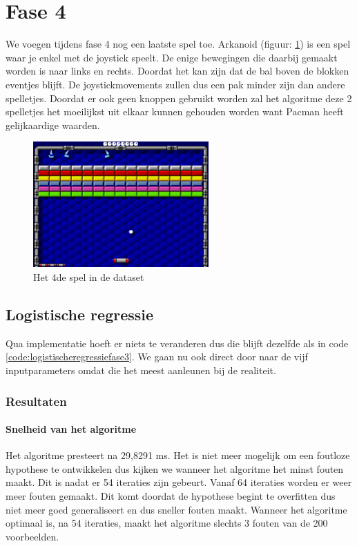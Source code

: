 
\newpage
\section{Fase 4}
\label{sec:Fase4}

We voegen tijdens fase 4 nog een laatste spel toe. Arkanoid (figuur: \ref{fig:akranoid}) is een spel waar je enkel met de joystick speelt. De enige bewegingen die daarbij gemaakt worden is naar links en rechts. Doordat het kan zijn dat de bal boven de blokken eventjes blijft. De joystickmovements zullen dus een pak minder zijn dan andere spelletjes. Doordat er ook geen knoppen gebruikt worden zal het algoritme deze 2 spelletjes het moeilijkst uit elkaar kunnen gehouden worden want Pacman heeft gelijkaardige waarden. 

\begin{figure}[]
	\centering
	\includegraphics[width=0.6\textwidth]{img/arkanoid.png}
	\caption{Het 4de spel in de dataset}
	\label{fig:akranoid}
\end{figure}

\subsection{Logistische regressie}
\label{sec:Logistischeregressie-fase4}

Qua implementatie hoeft er niets te veranderen dus die blijft dezelfde als in code \ref{code:logistischeregressiefase3}. We gaan nu ook direct door naar de vijf inputparameters omdat die het meest aanleunen bij de realiteit. 

\subsubsection{Resultaten}
\paragraph{Snelheid van het algoritme} 
Het algoritme presteert na 29,8291 ms. Het is niet meer mogelijk om een foutloze hypothese te ontwikkelen dus kijken we wanneer het algoritme het minst fouten maakt. Dit is nadat er 54 iteraties zijn gebeurt. Vanaf 64 iteraties worden er weer meer fouten gemaakt. Dit komt doordat de hypothese begint te overfitten dus niet meer goed generaliseert en dus sneller fouten maakt.
Wanneer het algoritme optimaal is, na 54 iteraties, maakt het algoritme slechts 3 fouten van de 200 voorbeelden.

